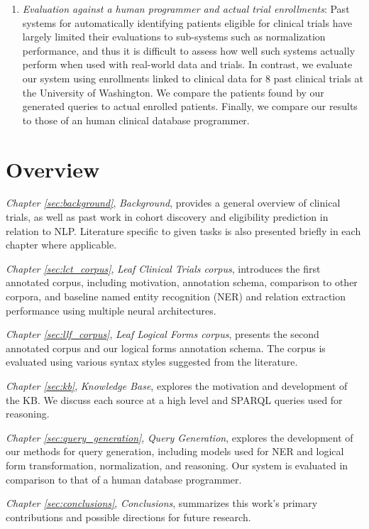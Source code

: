 \documentclass[../main.tex]{subfiles}
\begin{document}
\begin{enumerate}
    \item \textit{Evaluation against a human programmer and actual trial enrollments}: Past systems for automatically identifying patients eligible for clinical trials have largely limited their evaluations to sub-systems such as normalization performance, and thus it is difficult to assess how well such systems actually perform when used with real-world data and trials. In contrast, we evaluate our system using enrollments linked to clinical data for 8 past clinical trials at the University of Washington. We compare the patients found by our generated queries to actual enrolled patients. Finally, we compare our results to those of an human clinical database programmer.
\end{enumerate}

\section{Overview}

\textit{Chapter \ref{sec:background}}, \textit{Background}, provides a general overview of clinical trials, as well as past work in cohort discovery and eligibility prediction in relation to NLP. Literature specific to given tasks is also presented briefly in each chapter where applicable. 

\textit{Chapter \ref{sec:lct_corpus}}, \textit{Leaf Clinical Trials corpus}, introduces the first annotated corpus, including motivation, annotation schema, comparison to other corpora, and baseline named entity recognition (NER) and relation extraction performance using multiple neural architectures.

\textit{Chapter \ref{sec:llf_corpus}}, \textit{Leaf Logical Forms corpus}, presents the second annotated corpus and our logical forms annotation schema. The corpus is evaluated using various syntax styles suggested from the literature.

\textit{Chapter \ref{sec:kb}}, \textit{Knowledge Base}, explores the motivation and development of the KB. We discuss each source at a high level and SPARQL queries used for reasoning.

\textit{Chapter \ref{sec:query_generation}}, \textit{Query Generation}, explores the development of our methods for query generation, including models used for NER and logical form transformation, normalization, and reasoning. Our system is evaluated in comparison to that of a human database programmer.

\textit{Chapter \ref{sec:conclusions}}, \textit{Conclusions}, summarizes this work's primary contributions and possible directions for future research.
\end{document}
